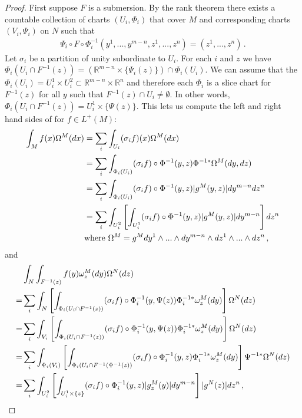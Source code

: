 \begin{proof}
First suppose $F$ is a submersion. By the rank theorem there exists a countable collection of charts $(U_i,\Phi_i)$ that cover $M$ and corresponding charts $(V_i,\Psi_i)$ on $N$ such that 
\begin{align}
\Psi_i\circ F\circ \Phi_i^{-1}(y^1,...,y^{m-n},z^1,...,z^n)=(z^1,...,z^n)\,.
\end{align}
Let $\sigma_i$ be a partition of unity subordinate to $U_i$.  For each $i$ and $z$ we have $\Phi_i(U_i\cap F^{-1}(z))=\left(\mathbb{R}^{m-n}\times\{\Psi_i(z)\}\right)\cap \Phi_i(U_i)$.  We can assume that the $\Phi_i(U_i)=U_i^1\times U_i^2\subset \mathbb{R}^{m-n}\times \mathbb{R}^n$ and therefore each $\Phi_i$ is a slice chart for $F^{-1}(z)$ for all $y$ such that $F^{-1}(z)\cap U_i\neq \emptyset$.  In other words, $\Phi_i(U_i\cap F^{-1}(z))= U_i^1\times \{\Psi(z)\}$.  This lets us compute the left and right hand sides of  for $f\in L^+(M)$:
\begin{align}
\int_Mf(x) \Omega^M(dx)&=\sum_i\int_{U_i}(\sigma_if)(x) \Omega^M(dx)\\
&=\sum_i\int_{\Phi_i(U_i)}(\sigma_if)\circ \Phi^{-1}(y,z) \Phi^{-1*}\Omega^M(dy,dz)\notag\\
&=\sum_i\int_{\Phi_i(U_i)}(\sigma_if)\circ \Phi^{-1}(y,z)|g^M(y,z)| dy^{m-n}dz^n\notag\\
&=\sum_i\int_{U_i^2}\left[\int_{U_i^1}(\sigma_if)\circ \Phi^{-1}(y,z)|g^M(y,z)| dy^{m-n}\right]dz^n\notag\\
&\text{where }\Omega^M=g^M dy^1\wedge...\wedge dy^{m-n}\wedge dz^1\wedge...\wedge dz^n\,,\notag
\end{align}
and
\begin{align}
&\int_{N}\int_{F^{-1}(z)} f(y)\omega^M_z(dy) \Omega^N(dz)\\
=&\sum_i \int_{N}\left[\int_{\Phi_i(U_i\cap F^{-1}(z))} (\sigma_if)\circ\Phi_i^{-1}(y,\Psi(z))\Phi_i^{-1*}\omega^M_z(dy)\right] \Omega^N(dz)\notag\\
=&\sum_i \int_{V_i}\left[\int_{\Phi_i(U_i\cap F^{-1}(z))} (\sigma_if)\circ\Phi_i^{-1}(y,\Psi(z))\Phi_i^{-1*}\omega^M_z(dy)\right] \Omega^N(dz)\notag\\
=&\sum_i \int_{\Psi_i(V_i)}\left[\int_{\Phi_i(U_i\cap F^{-1}(\Psi^{-1}(z))} (\sigma_if)\circ\Phi_i^{-1}(y,z)\Phi_i^{-1*}\omega^M_z(dy)\right] \Psi^{-1*}\Omega^N(dz)\notag\\
=&\sum_i \int_{U_i^2}\left[\int_{U_i^1\times \{z\}} (\sigma_if)\circ\Phi_i^{-1}(y,z)|g^M_z(y)| dy^{m-n}\right] |g^N(z)| dz^n\,,\notag\\

\end{align}
\end{proof}
